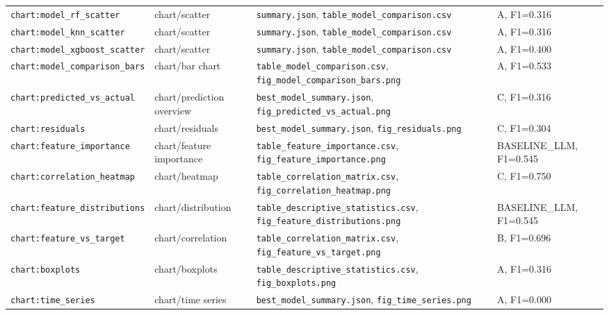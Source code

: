 \documentclass[11pt,a4paper]{article}
\newcommand{\field}[1]{\texttt{#1}}
\begin{document}
\begin{longtable}{>{\raggedright\arraybackslash}p{4.4cm} >{\raggedright\arraybackslash}p{3.4cm} >{\raggedright\arraybackslash}p{4.8cm} >{\raggedright\arraybackslash}p{2.2cm}}
\field{chart:model\_rf\_scatter} & chart/scatter & \field{summary.json}, \field{table\_model\_comparison.csv} & A, F1=0.316 \\
\field{chart:model\_knn\_scatter} & chart/scatter & \field{summary.json}, \field{table\_model\_comparison.csv} & A, F1=0.316 \\
\field{chart:model\_xgboost\_scatter} & chart/scatter & \field{summary.json}, \field{table\_model\_comparison.csv} & A, F1=0.400 \\
\field{chart:model\_comparison\_bars} & chart/bar chart & \field{table\_model\_comparison.csv}, \field{fig\_model\_comparison\_bars.png} & A, F1=0.533 \\
\field{chart:predicted\_vs\_actual} & chart/prediction overview & \field{best\_model\_summary.json}, \field{fig\_predicted\_vs\_actual.png} & C, F1=0.316 \\
\field{chart:residuals} & chart/residuals & \field{best\_model\_summary.json}, \field{fig\_residuals.png} & C, F1=0.304 \\
\field{chart:feature\_importance} & chart/feature importance & \field{table\_feature\_importance.csv}, \field{fig\_feature\_importance.png} & BASELINE\_LLM, F1=0.545 \\
\field{chart:correlation\_heatmap} & chart/heatmap & \field{table\_correlation\_matrix.csv}, \field{fig\_correlation\_heatmap.png} & C, F1=0.750 \\
\field{chart:feature\_distributions} & chart/distribution & \field{table\_descriptive\_statistics.csv}, \field{fig\_feature\_distributions.png} & BASELINE\_LLM, F1=0.545 \\
\field{chart:feature\_vs\_target} & chart/correlation & \field{table\_correlation\_matrix.csv}, \field{fig\_feature\_vs\_target.png} & B, F1=0.696 \\
\field{chart:boxplots} & chart/boxplots & \field{table\_descriptive\_statistics.csv}, \field{fig\_boxplots.png} & A, F1=0.316 \\
\field{chart:time\_series} & chart/time series & \field{best\_model\_summary.json}, \field{fig\_time\_series.png} & A, F1=0.000 \\
\bottomrule
\end{longtable}
\end{document}
